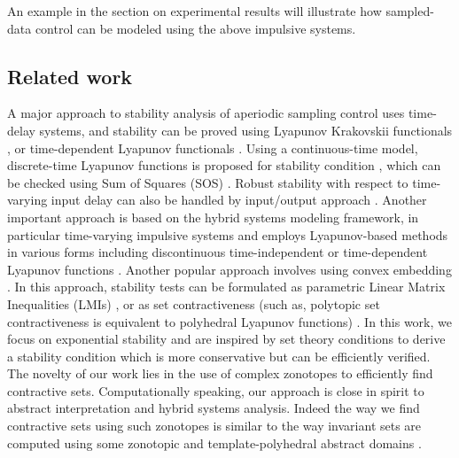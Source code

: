 
An example in the section on experimental results will illustrate how
sampled-data control can be modeled using the above impulsive systems.

\subsection*{Related work} 
A major approach to stability analysis of aperiodic sampling control uses time-delay 
systems, and stability can be proved using Lyapunov Krakovskii functionals 
\cite{Mikheev1988,Teel1998,2010-liu-stability,Mazenc2013}, 
or time-dependent Lyapunov functionals \cite{2010-fridman-refined}. Using a continuous-time model,  
discrete-time Lyapunov functions is proposed for stability condition \cite{2012-seuret-novel}, 
which can be checked using Sum of Squares (SOS) \cite{2013-seuret-stability}. Robust stability with respect to 
time-varying input delay can also be handled by input/output approach 
\cite{Mirkin2007,DBLP:journals/automatica/Fujioka09,DBLP:conf/amcc/KaoW14,Omran2013,Omran2014}.
Another important approach is based on the hybrid systems modeling framework, in particular time-varying impulsive systems 
\cite{Hu2003,nevsic2004framework,Goebel2009,Cai2008,BauLoo_NECSYS12a} and employs Lyapunov-based 
methods in various forms including discontinuous time-independent \cite{2008-naghshtabrizi-exponential} 
or time-dependent Lyapunov functions \cite{2010-fridman-refined}. Another popular 
approach involves using convex embedding \cite{HetelDaafouz2006,Fujioka2009,HetelKruszewski2011,2013hetel,Omran2014}. 
In this approach, stability tests can be formulated as parametric Linear Matrix Inequalities (LMIs) \cite{HetelDaafouz2006}, 
or as set contractiveness (such as, polytopic set contractiveness is equivalent to polyhedral Lyapunov 
functions) \cite{2014-fiacchini-set,2013-briat-convex,Lazar2013,athanasopoulos2014alternative,AlKhatib2015}. 
In this work, we focus on exponential stability and are inspired by
set theory conditions
\cite{2014-fiacchini-set,athanasopoulos2014alternative,AlKhatib2015} to derive a stability condition which is more conservative 
but can be efficiently verified. The novelty of our work lies in the use of complex zonotopes to efficiently 
find contractive sets. Computationally speaking, our approach is close in spirit to abstract interpretation
and hybrid systems analysis. Indeed the way we find contractive sets using such zonotopes is similar 
to the way invariant sets are computed using some zonotopic
\cite{Girard05reachabilityof,Althoff2011,DBLP:conf/sas/GoubaultPV12} and
template-polyhedral abstract domains \cite{Sriram2008,jeannet2009apron}.



